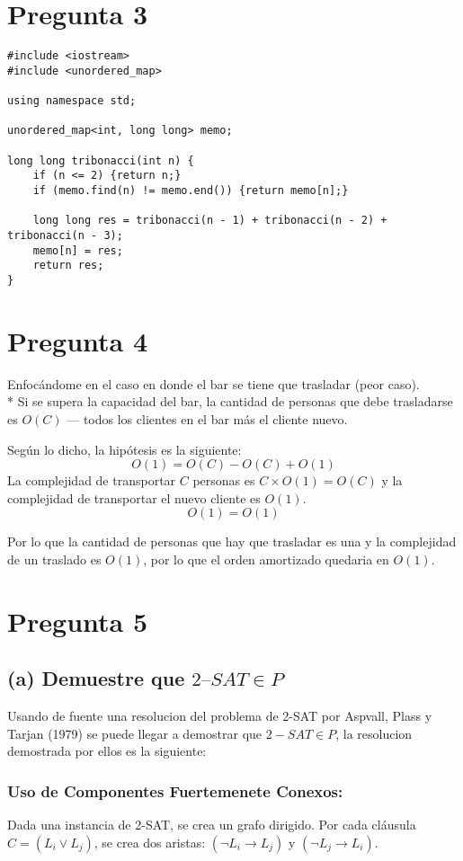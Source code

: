 \documentclass{article}
\begin{document}
\section*{Pregunta 3}
\begin{lstlisting}[style=customcpp]
#include <iostream>
#include <unordered_map>

using namespace std;

unordered_map<int, long long> memo;

long long tribonacci(int n) {
    if (n <= 2) {return n;}
    if (memo.find(n) != memo.end()) {return memo[n];}

    long long res = tribonacci(n - 1) + tribonacci(n - 2) + tribonacci(n - 3);
    memo[n] = res;
    return res;
}
\end{lstlisting}

\section*{Pregunta 4}

Enfocándome en el caso en donde el bar se tiene que trasladar (peor caso). \\
* Si se supera la capacidad del bar, la cantidad de personas que debe trasladarse es \(O(C)\) — todos los clientes en el bar más el cliente nuevo.

Según lo dicho, la hipótesis es la siguiente:
\[O(1) = O(C) - O(C) + O(1)\] 
La complejidad de transportar \(C\) personas es \(C \times O(1) = O(C)\) y la complejidad de transportar el nuevo cliente es \(O(1)\).
\[O(1) = O(1)\]

Por lo que la cantidad de personas que hay que trasladar es una y la complejidad de un traslado es \(O(1)\), por lo que el orden amortizado quedaria en \(O(1)\).

\section*{Pregunta 5}

\subsection*{(a) Demuestre que $2–SAT \in P$}

Usando de fuente una resolucion del problema de 2-SAT por Aspvall, Plass y Tarjan (1979) se puede llegar a demostrar que $2-SAT \in P$, la resolucion demostrada por ellos es la siguiente:

\subsubsection*{Uso de Componentes Fuertemenete Conexos:}
Dada una instancia de 2-SAT, se crea un grafo dirigido. Por cada cláusula $C = (L_i \vee L_j)$, se crea dos aristas: $(\neg L_i \rightarrow L_j)$ y $(\neg L_j \rightarrow L_i)$.
\end{document}
